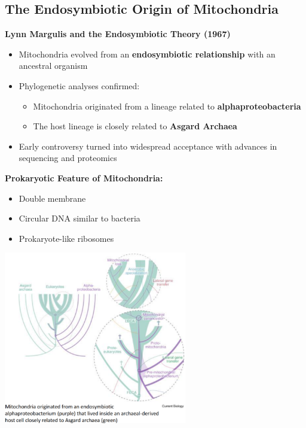 \documentclass[10pt]{article}
\begin{document}
\subsection*{The Endosymbiotic Origin of Mitochondria}
\textbf{Lynn Margulis and the Endosymbiotic Theory (1967)}
\begin{itemize}
	\item Mitochondria evolved from an \textbf{endosymbiotic relationship} with an ancestral organism
	\item Phylogenetic analyses confirmed:
	\begin{itemize}
        \item Mitochondria originated from a lineage related to \textbf{alphaproteobacteria}
        \item The host lineage is closely related to \textbf{Asgard Archaea}
    \end{itemize}
    \item Early controversy turned into widespread acceptance with advances in sequencing and proteomics
\end{itemize}
\textbf{Prokaryotic Feature of Mitochondria:}
\begin{itemize}
	\item Double membrane
	\item Circular DNA similar to bacteria
	\item Prokaryote-like ribosomes
\end{itemize}
\begin{center} 
	\includegraphics*[width=0.6\textwidth]{L3_6.png}
\end{center}
\end{document}
